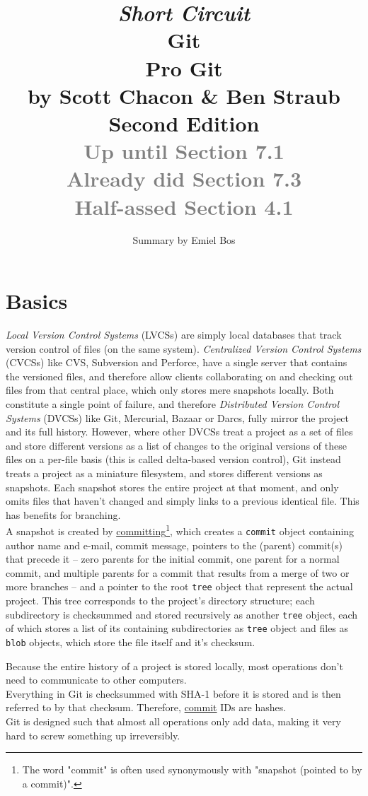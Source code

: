 \documentclass[table, xcdraw]{article}%
\title{
\textit{Short Circuit}\\
\vspace{15px}
\huge
Git\\
\vspace{20px}
\large
Pro Git\\
by Scott Chacon \& Ben Straub\\
Second Edition\\
\textcolor{gray}{Up until Section 7.1\\Already did Section 7.3\\Half-assed Section 4.1}
}
\author{Summary by Emiel Bos}
\date{}
\begin{document}
\maketitle

\section{Basics}

\emph{Local Version Control Systems} (LVCSs) are simply local databases that track version control of files (on the same system). \emph{Centralized Version Control Systems} (CVCSs) like CVS, Subversion and Perforce, have a single server that contains the versioned files, and therefore allow clients collaborating on and checking out files from that central place, which only stores mere snapshots locally. Both constitute a single point of failure, and therefore \emph{Distributed Version Control Systems} (DVCSs) like Git, Mercurial, Bazaar or Darcs, fully mirror the project and its full history. However, where other DVCSs treat a project as a set of files and store different versions as a list of changes to the original versions of these files on a per-file basis (this is called delta-based version control), Git instead treats a project as a miniature filesystem, and stores different versions as snapshots. Each snapshot stores the entire project at that moment, and only omits files that haven't changed and simply links to a previous identical file. This has benefits for branching.\\
A snapshot is created by \hyperref[commit]{committing}\footnote{The word "commit" is often used synonymously with "snapshot (pointed to by a commit)".}, which creates a \texttt{commit} object containing author name and e-mail, commit message, pointers to the (parent) commit(s) that precede it -- zero parents for the initial commit, one parent for a normal commit, and multiple parents for a commit that results from a merge of two or more branches -- and a pointer to the root \texttt{tree} object that represent the actual project. This tree corresponds to the project's directory structure; each subdirectory is checksummed and stored recursively as another \texttt{tree} object, each of which stores a list of its containing subdirectories as \texttt{tree} object and files as \texttt{blob} objects, which store the file itself and it's checksum.

Because the entire history of a project is stored locally, most operations don't need to communicate to other computers.\\
Everything in Git is checksummed with SHA-1 before it is stored and is then referred to by that checksum. Therefore, \hyperref[commit]{commit} IDs are hashes.\\
Git is designed such that almost all operations only add data, making it very hard to screw something up irreversibly.
\end{document}
